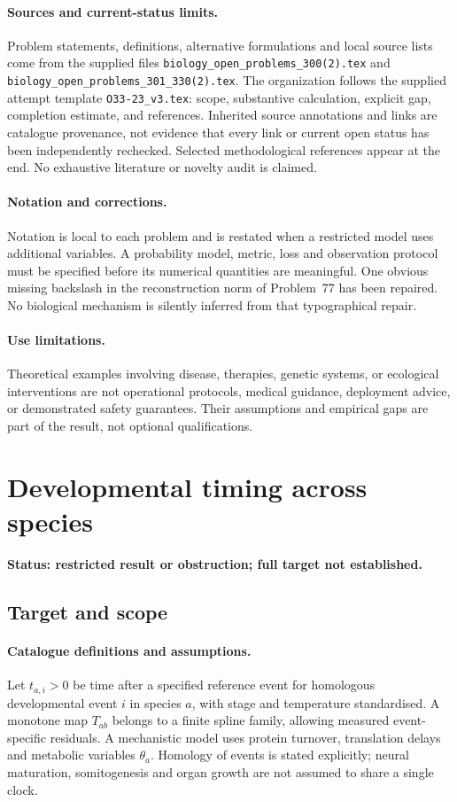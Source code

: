 \documentclass[11pt]{article}
\begin{document}
\paragraph{Sources and current-status limits.}
Problem statements, definitions, alternative formulations and local source lists
come from the supplied files
\texttt{biology\_open\_problems\_300(2).tex} and
\texttt{biology\_open\_problems\_301\_330(2).tex}.
The organization follows the supplied attempt template
\texttt{O33-23\_v3.tex}: scope, substantive calculation, explicit gap,
completion estimate, and references. Inherited source annotations and links are
catalogue provenance, not evidence that every link or current open status has
been independently rechecked. Selected methodological references appear at the
end. No exhaustive literature or novelty audit is claimed.

\paragraph{Notation and corrections.}
Notation is local to each problem and is restated when a restricted model uses
additional variables. A probability model, metric, loss and observation protocol
must be specified before its numerical quantities are meaningful. One obvious
missing backslash in the reconstruction norm of Problem~77 has been repaired.
No biological mechanism is silently inferred from that typographical repair.

\paragraph{Use limitations.}
Theoretical examples involving disease, therapies, genetic systems, or ecological
interventions are not operational protocols, medical guidance, deployment advice,
or demonstrated safety guarantees. Their assumptions and empirical gaps are part
of the result, not optional qualifications.


\section*{Developmental timing across species}
\label{prob:132}
\noindent\textbf{Status: restricted result or obstruction; full target not established.}
\subsection{Target and scope}
\paragraph{Catalogue definitions and assumptions.}
Let $t_{a,i}>0$ be time after a specified reference event for homologous developmental event $i$ in species $a$, with stage and temperature standardised. A monotone map $T_{ab}$ belongs to a finite spline family, allowing measured event-specific residuals. A mechanistic model uses protein turnover, translation delays and metabolic variables $\theta_a$. Homology of events is stated explicitly; neural maturation, somitogenesis and organ growth are not assumed to share a single clock.
\end{document}
